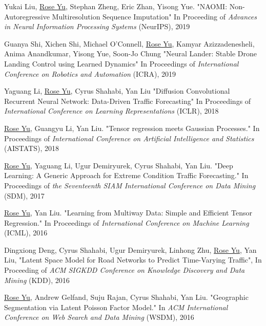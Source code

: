\documentclass[margin,line]{res}
\begin{document}
\begin{resume}
\begin{enumerate}[label={[C\arabic*]}]
 
\item  Yukai Liu, \underline{Rose Yu}, Stephan Zheng, Eric Zhan, Yisong Yue. "NAOMI: Non-Autoregressive Multiresolution Sequence Imputation" In  Proceeding of  \textit{Advances in Neural Information Processing Systems} (NeurIPS), 2019


\item Guanya Shi, Xichen Shi, Michael O'Connell, \underline{Rose Yu}, Kamyar Azizzadenesheli, Anima Anandkumar, Yisong Yue, Soon-Jo Chung
       "Neural Lander: Stable Drone Landing Control using Learned Dynamics" In  Proceedings  of \textit{ International Conference on Robotics and Automation} (ICRA), 2019

\item 	Yaguang Li,  \underline{Rose Yu}, Cyrus Shahabi, Yan Liu
	"Diffusion Convolutional Recurrent Neural Network: Data-Driven Traffic Forecasting" In  Proceedings  of   \textit{International Conference on Learning Representations
	}(ICLR), 2018 
	
\item  \underline{Rose Yu}, Guangyu Li, Yan Liu. "Tensor regression meets Gaussian Processes." In Proceedings  of   \textit{International Conference on Artificial Intelligence and Statistics} (AISTATS), 2018 

\item \underline{Rose Yu}, Yaguang Li, Ugur Demiryurek, Cyrus Shahabi, Yan Liu. "Deep Learning: A Generic Approach for Extreme Condition Traffic Forecasting." In   Proceedings  of  \textit{the Seventeenth SIAM International Conference on Data Mining }(SDM), 2017

\item \underline{Rose Yu}, Yan Liu. "Learning from Multiway Data: Simple and Efficient Tensor Regression." In Proceedings  of  \textit{International Conference on Machine Learning }(ICML),   2016

\item Dingxiong Deng, Cyrus Shahabi, Ugur Demiryurek, Linhong Zhu,  \underline{Rose Yu}, Yan Liu, 
"Latent Space Model for Road Networks to Predict Time-Varying Traffic", In Proceeding of  \textit{ACM SIGKDD Conference on Knowledge Discovery and Data Mining } (KDD), 2016


\item \underline{Rose Yu}, Andrew Gelfand, Suju Rajan, Cyrus Shahabi, Yan Liu. "Geographic Segmentation via Latent Poisson Factor Model." In \textit{ACM International Conference on Web Search and Data Mining} (WSDM), 2016 


\end{enumerate}
\end{resume}
\end{document}
